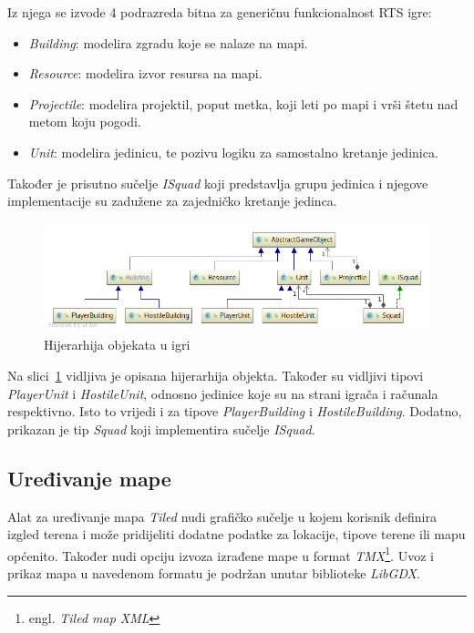 \documentclass[times, utf8, zavrsni, numeric]{fer}
\begin{document}
\par Iz njega se izvode 4 podrazreda bitna za generičnu funkcionalnost RTS igre:
\begin{itemize}
	\item \textit{Building}: modelira zgradu koje se nalaze na mapi.
	\item \textit{Resource}: modelira izvor resursa na mapi.
	\item \textit{Projectile}: modelira projektil, poput metka, koji leti po mapi i vrši štetu nad metom koju pogodi.
	\item \textit{Unit}: modelira jedinicu, te pozivu logiku za samostalno kretanje jedinica. 
\end{itemize}
Također je prisutno sučelje \textit{ISquad} koji predstavlja grupu jedinica i njegove implementacije su zadužene za zajedničko kretanje jedinca.

\begin{figure}[h]
	\centering
	\includegraphics[width=0.8\linewidth]{images/umlObjects.png}
	\caption{Hijerarhija objekata u igri}
	\label{fig:umlObjects}
\end{figure}

\par Na slici~\ref{fig:umlObjects} vidljiva je opisana hijerarhija objekta.
Također su vidljivi tipovi \textit{PlayerUnit} i \textit{HostileUnit}, odnosno jedinice koje su na strani igrača i računala respektivno.
Isto to vrijedi i za tipove \textit{PlayerBuilding} i \textit{HostileBuilding}.
Dodatno, prikazan je tip \textit{Squad} koji implementira sučelje \textit{ISquad}.

\subsection{Uređivanje mape}

\par Alat za uređivanje mapa \textit{Tiled} nudi grafičko sučelje u kojem korisnik definira izgled terena i može pridijeliti dodatne podatke za lokacije, tipove terene ili mapu općenito.
Također nudi opciju izvoza izrađene mape u format \textit{TMX}\footnote{engl. \textit{Tiled map XML}}.
Uvoz i prikaz mapa u navedenom formatu je podržan unutar biblioteke \textit{LibGDX}.
\end{document}
